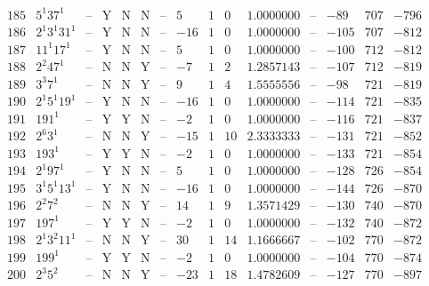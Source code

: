 \documentclass[11pt,reqno,a4letter]{article}
\numberwithin{figure}{section}
\numberwithin{table}{section}
\theoremstyle{plain}
\numberwithin{theorem}{section}
\theoremstyle{definition}
\begin{document}
\begin{table}[h!]
\begin{equation*}
{\begin{array}{|cc|c|ccc|c|c|ccc|c|ccc}
 185 & 5^1 37^1 & \text{--} & \text{Y} & \text{N} & \text{N} & \text{--} & 5 & 1 & 0 & 1.0000000 & \text{--} & -89 & 707 & -796 \\
 186 & 2^1 3^1 31^1 & \text{--} & \text{Y} & \text{N} & \text{N} & \text{--} & -16 & 1 & 0 & 1.0000000 & \text{--} & -105 & 707 & -812 \\
 187 & 11^1 17^1 & \text{--} & \text{Y} & \text{N} & \text{N} & \text{--} & 5 & 1 & 0 & 1.0000000 & \text{--} & -100 & 712 & -812 \\
 188 & 2^2 47^1 & \text{--} & \text{N} & \text{N} & \text{Y} & \text{--} & -7 & 1 & 2 & 1.2857143 & \text{--} & -107 & 712 & -819 \\
 189 & 3^3 7^1 & \text{--} & \text{N} & \text{N} & \text{Y} & \text{--} & 9 & 1 & 4 & 1.5555556 & \text{--} & -98 & 721 & -819 \\
 190 & 2^1 5^1 19^1 & \text{--} & \text{Y} & \text{N} & \text{N} & \text{--} & -16 & 1 & 0 & 1.0000000 & \text{--} & -114 & 721 & -835 \\
 191 & 191^1 & \text{--} & \text{Y} & \text{Y} & \text{N} & \text{--} & -2 & 1 & 0 & 1.0000000 & \text{--} & -116 & 721 & -837 \\
 192 & 2^6 3^1 & \text{--} & \text{N} & \text{N} & \text{Y} & \text{--} & -15 & 1 & 10 & 2.3333333 & \text{--} & -131 & 721 & -852 \\
 193 & 193^1 & \text{--} & \text{Y} & \text{Y} & \text{N} & \text{--} & -2 & 1 & 0 & 1.0000000 & \text{--} & -133 & 721 & -854 \\
 194 & 2^1 97^1 & \text{--} & \text{Y} & \text{N} & \text{N} & \text{--} & 5 & 1 & 0 & 1.0000000 & \text{--} & -128 & 726 & -854 \\
 195 & 3^1 5^1 13^1 & \text{--} & \text{Y} & \text{N} & \text{N} & \text{--} & -16 & 1 & 0 & 1.0000000 & \text{--} & -144 & 726 & -870 \\
 196 & 2^2 7^2 & \text{--} & \text{N} & \text{N} & \text{Y} & \text{--} & 14 & 1 & 9 & 1.3571429 & \text{--} & -130 & 740 & -870 \\
 197 & 197^1 & \text{--} & \text{Y} & \text{Y} & \text{N} & \text{--} & -2 & 1 & 0 & 1.0000000 & \text{--} & -132 & 740 & -872 \\
 198 & 2^1 3^2 11^1 & \text{--} & \text{N} & \text{N} & \text{Y} & \text{--} & 30 & 1 & 14 & 1.1666667 & \text{--} & -102 & 770 & -872 \\
 199 & 199^1 & \text{--} & \text{Y} & \text{Y} & \text{N} & \text{--} & -2 & 1 & 0 & 1.0000000 & \text{--} & -104 & 770 & -874 \\
 200 & 2^3 5^2 & \text{--} & \text{N} & \text{N} & \text{Y} & \text{--} & -23 & 1 & 18 & 1.4782609 & \text{--} & -127 & 770 & -897 \\
\end{array}
}
\end{equation*}

\end{table} 
\end{document}
